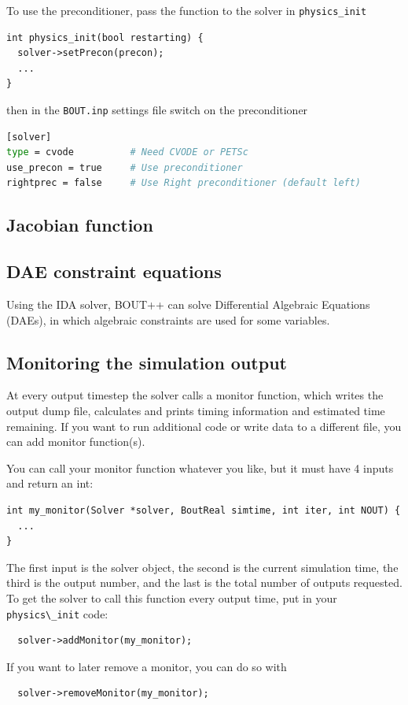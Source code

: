 \documentclass[12pt]{article}
\begin{document}
To use the preconditioner, pass the function to the solver in \lstinline!physics_init!
\begin{lstlisting}
int physics_init(bool restarting) {
  solver->setPrecon(precon);
  ...
}
\end{lstlisting}
then in the \texttt{BOUT.inp} settings file switch on the preconditioner
\begin{lstlisting}[language=bash,numbers=none]
[solver]
type = cvode          # Need CVODE or PETSc
use_precon = true     # Use preconditioner
rightprec = false     # Use Right preconditioner (default left)
\end{lstlisting}

\subsection{Jacobian function}



\subsection{DAE constraint equations}

Using the IDA solver, BOUT++ can solve Differential Algebraic Equations (DAEs), in which 
algebraic constraints are used for some variables. 


\subsection{Monitoring the simulation output}

At every output timestep the solver calls a monitor function, which writes the output dump file,  calculates and prints timing information and estimated time remaining. If you want to run additional code or write data to a different file, you can add monitor function(s).

You can call your monitor function whatever you like, but it must have 4 inputs and return an int:
\begin{lstlisting}
int my_monitor(Solver *solver, BoutReal simtime, int iter, int NOUT) {
  ...
}
\end{lstlisting}

The first input is the solver object, the second is the current simulation time, the third is the output number, and the last is the total number of outputs requested. To get the solver to call this function every output time, put in your \lstinline!physics\_init! code:
\begin{lstlisting}
  solver->addMonitor(my_monitor);
\end{lstlisting}
If you want to later remove a monitor, you can do so with
\begin{lstlisting}
  solver->removeMonitor(my_monitor);
\end{lstlisting}
\end{document}
